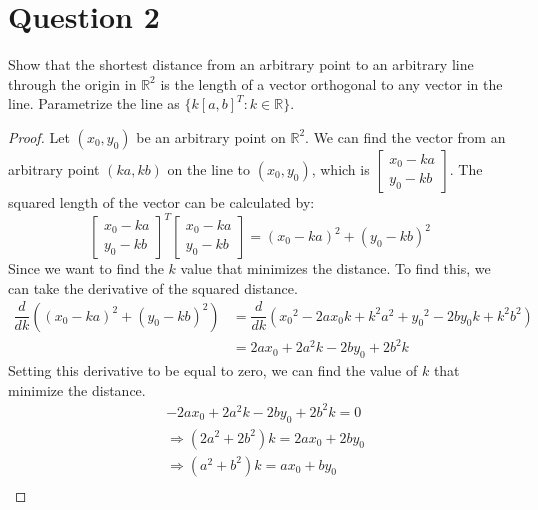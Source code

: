 \section{Question 2}

\begin{question}
    Show that the shortest distance from an arbitrary point to an arbitrary line through the origin in $\mathbb{R}^2$ is the length of a vector orthogonal to any vector in the line. Parametrize the line as $\{k[a,b]^T: k \in \mathbb{R}\}$.
\end{question}

\begin{answer}
    \begin{proof}
    Let $(x_0,y_0)$ be an arbitrary point on ${\mathbb{R}}^2$. We can find the vector from an arbitrary point $(ka,kb)$ on the line to $(x_0,y_0)$, which is $\left[\begin{smallmatrix} x_0 - ka \\ y_0 - kb \end{smallmatrix} \right]$. The squared length of the vector can be calculated by:
    \begin{equation}
        \left[\begin{matrix}
        x_0 - ka\\
        y_0 - kb
        \end{matrix}\right]^{T}
        \left[\begin{matrix}
        x_0 - ka\\
        y_0 - kb
        \end{matrix}\right] = (x_0 - ka)^2 + (y_0 - kb)^2
    \end{equation}
    Since we want to find the $k$ value that minimizes the distance. To find this, we can take the derivative of the squared distance.
    \begin{align}
        \dfrac{d}{dk}{\left((x_0 - ka)^2 + (y_0 - kb)^2\right)} &= \dfrac{d}{dk}{\left({x_0}^2 - 2ax_0k + k^2a^2 + {y_0}^2 - 2by_0k + k^2b^2\right)}\\
        &= 2ax_0 + 2a^2k - 2by_0 + 2b^2k
    \end{align}
    Setting this derivative to be equal to zero, we can find the value of $k$ that minimize the distance.
    \begin{align}
        &-2ax_0 + 2a^2k - 2by_0 + 2b^2k = 0\\
        & \Rightarrow (2a^2 + 2b^2)k = 2ax_0 + 2by_0\\
        & \Rightarrow (a^2 + b^2)k = ax_0 + by_0\\

\end{align}
\end{proof}
\end{answer}
